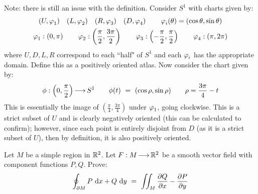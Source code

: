 Note: there is still an issue with the definition. Consider $ S^{1} $ with charts
given by:
\begin{gather*}
    (U, \operatorname{\varphi}_{1}) \quad
    (L, \operatorname{\varphi}_{2}) \quad
    (R, \operatorname{\varphi}_{3}) \quad
    (D, \operatorname{\varphi}_{4}) \qquad
    \operatorname{\varphi}_{i}(\theta) = (\cos\theta, \sin\theta) \\
    \operatorname{\varphi}_{1}:\left(0,\pi\right) \qquad 
    \operatorname{\varphi}_{2}:\left(\frac{\pi}{2},\frac{3\pi}{2}\right) \qquad 
    \operatorname{\varphi}_{3}:\left(-\frac{\pi}{2},\frac{\pi}{2}\right) \qquad 
    \operatorname{\varphi}_{4}:\left(\pi,2\pi\right)
\end{gather*}
where $ U,D,L,R $ correspond to each ``half" of $ S^{1} $ and each $ \operatorname{\varphi}_{i} $
has the appropriate domain. Define this as a positively oriented atlas. Now
consider the chart given by:
\begin{equation*}
    \phi:\left( 0,\frac{\pi}{2} \right) \operatorname{\longrightarrow} S^{1} \qquad
    \phi(t) \ = \ (\cos\rho,\sin\rho) \qquad
    \rho = \frac{3\pi}{4} - t
\end{equation*}
This is essentially the image of $ (\frac{\pi}{4},\frac{3\pi}{4}) $ under
$ \operatorname{\varphi}_{1} $, going clockwise. This is a strict subset of $ U $ and is clearly
negatively oriented (this can be calculated to confirm); however, since each
point is entirely disjoint from $ D $ (as it is a strict subset of $ U $), then
by definition, it is also positively oriented.

\newpage
\label{q45}
\begin{qu}[title=Green's Theorem,num=45.1]
    Let $ M $ be a simple region in $ \mathbb{R}^{2} $.
    Let $ F:M \operatorname{\longrightarrow} \mathbb{R}^{2} $ be a smooth vector field with component functions
    $ P, Q $. Prove:
    \begin{equation*}
        \oint_{\p M} P\di x+Q\di y \ = \ \iint_{M} \frac{\p Q}{\p x}
        - \frac{\p P}{\p y}
    \end{equation*}
\end{qu}

